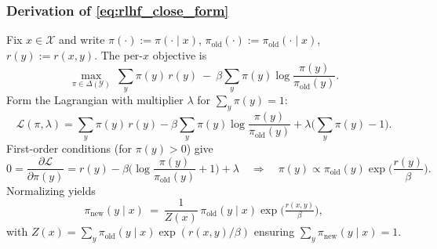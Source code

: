 \subsubsection{Derivation of \texorpdfstring{\eqref{eq:rlhf_close_form}}{the closed form}}
Fix $x\in\mathcal X$ and write $\pi(\cdot):=\pi(\cdot\mid x)$, $\pi_{\text{old}}(\cdot):=\pi_{\text{old}}(\cdot\mid x)$, $r(y):=r(x,y)$. The per-$x$ objective is
\[
\max_{\pi\in\Delta(\mathcal Y)} \ \sum_{y}\pi(y)\,r(y) \ - \ \beta \sum_{y}\pi(y)\log\frac{\pi(y)}{\pi_{\text{old}}(y)} .
\]
Form the Lagrangian with multiplier $\lambda$ for $\sum_y \pi(y)=1$:
\[
\mathcal L(\pi,\lambda)=\sum_{y}\pi(y)\,r(y) - \beta \sum_{y}\pi(y)\log\frac{\pi(y)}{\pi_{\text{old}}(y)} + \lambda\Big(\sum_{y}\pi(y)-1\Big).
\]
First-order conditions (for $\pi(y)>0$) give
\[
0=\frac{\partial\mathcal L}{\partial \pi(y)} = r(y) - \beta\Big(\log\frac{\pi(y)}{\pi_{\text{old}}(y)}+1\Big) + \lambda
\quad\Longrightarrow\quad
\pi(y) \propto \pi_{\text{old}}(y)\exp\!\Big(\frac{r(y)}{\beta}\Big).
\]
Normalizing yields
\[
\pi_{\text{new}}(y\mid x) \ = \ \frac{1}{Z(x)}\,\pi_{\text{old}}(y\mid x)\exp\!\Big(\tfrac{r(x,y)}{\beta}\Big),
\]
with $Z(x)=\sum_{y}\pi_{\text{old}}(y\mid x)\exp(r(x,y)/\beta)$ ensuring $\sum_y \pi_{\text{new}}(y\mid x)=1$.

